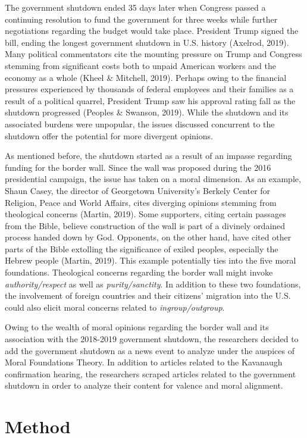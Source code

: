 \documentclass[english,,man]{apa6}
\begin{document}
The government shutdown ended 35 days later when Congress passed a
continuing resolution to fund the government for three weeks while
further negotiations regarding the budget would take place. President
Trump signed the bill, ending the longest government shutdown in U.S.
history (Axelrod, 2019). Many political commentators cite the mounting
pressure on Trump and Congress stemming from significant costs both to
unpaid American workers and the economy as a whole (Kheel \& Mitchell,
2019). Perhaps owing to the financial pressures experienced by thousands
of federal employees and their families as a result of a political
quarrel, President Trump saw his approval rating fall as the shutdown
progressed (Peoples \& Swanson, 2019). While the shutdown and its
associated burdens were unpopular, the issues discussed concurrent to
the shutdown offer the potential for more divergent opinions.

As mentioned before, the shutdown started as a result of an impasse
regarding funding for the border wall. Since the wall was proposed
during the 2016 presidential campaign, the issue has taken on a moral
dimension. As an example, Shaun Casey, the director of Georgetown
University's Berkely Center for Religion, Peace and World Affairs, cites
diverging opinions stemming from theological concerns (Martin, 2019).
Some supporters, citing certain passages from the Bible, believe
construction of the wall is part of a divinely ordained process handed
down by God. Opponents, on the other hand, have cited other parts of the
Bible extolling the significance of exiled peoples, especially the
Hebrew people (Martin, 2019). This example potentially ties into the
five moral foundations. Theological concerns regarding the border wall
might invoke \emph{authority/respect} as well as \emph{purity/sanctity}.
In addition to these two foundations, the involvement of foreign
countries and their citizens' migration into the U.S. could also elicit
moral concerns related to \emph{ingroup/outgroup}.

Owing to the wealth of moral opinions regarding the border wall and its
association with the 2018-2019 government shutdown, the researchers
decided to add the government shutdown as a news event to analyze under
the auspices of Moral Foundations Theory. In addition to articles
related to the Kavanaugh confirmation hearing, the researchers scraped
articles related to the government shutdown in order to analyze their
content for valence and moral alignment.

\section{Method}\label{method-1}
\end{document}
